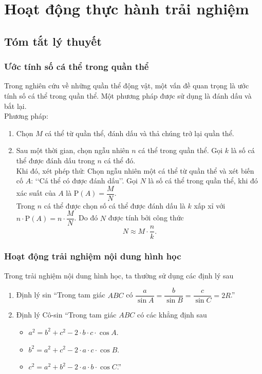 \section{Hoạt động thực hành trải nghiệm}
\subsection{Tóm tắt lý thuyết}
\subsubsection{Ước tính số cá thể trong quần thể}
Trong nghiên cứu về những quần thể động vật, một vấn đề quan trọng là ước tính số cá thể trong quần thể. Một phương pháp được sử dụng là đánh dấu và bắt lại.\\
Phương pháp: 
\begin{enumerate}
	\item Chọn $M$ cá thể từ quần thể, đánh dấu và thả chúng trở lại quần thể.
	\item Sau một thời gian, chọn ngẫu nhiên $n$ cá thể trong quần thể. Gọi $k$ là số cá thể được đánh dấu trong $n$ cá thể đó.\\
	Khi đó, xét phép thử: Chọn ngẫu nhiên một cá thể từ quần thể và xét biến cố $A$: \lq\lq Cá thể có được đánh dấu\rq\rq. Gọi $N$ là số cá thể trong quần thể, khi đó xác suất của $A$ là $\mathrm{P}(A)=\dfrac{M}{N}$.\\
	Trong $n$ cá thể được chọn số cá thể được đánh dấu là $k$ xấp xỉ với $n\cdot \mathrm{P}(A)=n\cdot \dfrac{M}{N}$. Do đó $N$ được tính bởi công thức 
	\[N\approx M\cdot \dfrac{n}{k}.\]
\end{enumerate}
\subsubsection{Hoạt động trải nghiệm nội dung hình học}
Trong trải nghiệm nội dung hình học, ta thường sử dụng các định lý sau
\begin{enumerate}
\item Định lý sin ``Trong tam giác $ABC$ có $\dfrac{a}{\sin A}=\dfrac{b}{\sin B}=\dfrac{c}{\sin C}=2R$.''
\item Định lý Cô-sin ``Trong tam giác $ABC$ có các khẳng định sau
\begin{itemize}
\item $a^{2}=b^{2}+c^{2}-2 \cdot b \cdot c \cdot \cos A$.
\item $b^{2}=a^{2}+c^{2}-2 \cdot a \cdot c \cdot \cos B$.
\item $c^{2}=a^{2}+b^{2}-2 \cdot a \cdot b \cdot \cos C$.''
\end{itemize}
\end{enumerate}

